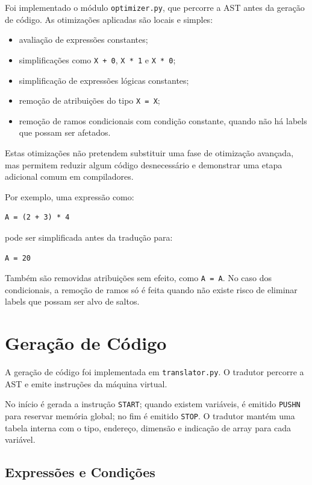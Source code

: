 \documentclass[11pt,a4paper]{article}
\begin{document}
Foi implementado o módulo \texttt{optimizer.py}, que percorre a AST antes da geração de código. As otimizações aplicadas são locais e simples:

\begin{itemize}
    \item avaliação de expressões constantes;
    \item simplificações como \texttt{X + 0}, \texttt{X * 1} e \texttt{X * 0};
    \item simplificação de expressões lógicas constantes;
    \item remoção de atribuições do tipo \texttt{X = X};
    \item remoção de ramos condicionais com condição constante, quando não há labels que possam ser afetados.
\end{itemize}

Estas otimizações não pretendem substituir uma fase de otimização avançada, mas permitem reduzir algum código desnecessário e demonstrar uma etapa adicional comum em compiladores.

Por exemplo, uma expressão como:

\begin{lstlisting}
A = (2 + 3) * 4
\end{lstlisting}

pode ser simplificada antes da tradução para:

\begin{lstlisting}
A = 20
\end{lstlisting}

Também são removidas atribuições sem efeito, como \texttt{A = A}. No caso dos condicionais, a remoção de ramos só é feita quando não existe risco de eliminar labels que possam ser alvo de saltos.

\section{Geração de Código}

A geração de código foi implementada em \texttt{translator.py}. O tradutor percorre a AST e emite instruções da máquina virtual.

No início é gerada a instrução \texttt{START}; quando existem variáveis, é emitido \texttt{PUSHN} para reservar memória global; no fim é emitido \texttt{STOP}. O tradutor mantém uma tabela interna com o tipo, endereço, dimensão e indicação de array para cada variável.

\subsection{Expressões e Condições}
\end{document}

